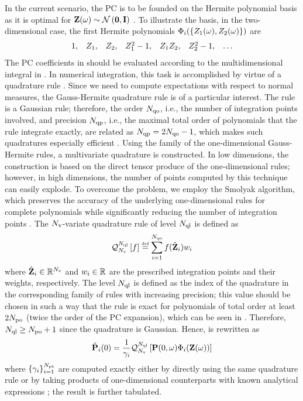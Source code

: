 In the current scenario, the PC is to be founded on the Hermite polynomial basis as it is optimal for $\vZ(\o) \sim \normal{\vZero}{\mI}$ \cite{xiu2002}. To illustrate the basis, in the two-dimensional case, the first Hermite polynomials $\Phi_i(\{ Z_1(\omega), Z_2(\omega) \})$ are
\[
  \begin{array}{lllllll}
  1, & Z_1, & Z_2, & Z_1^2 - 1, & Z_1 Z_2, & Z_2^2 - 1, & \dotsc
  \end{array}
\]
The PC coefficients in  should be evaluated according to the multidimensional integral in . In numerical integration, this task is accomplished by virtue of a quadrature rule \cite{press2007}. Since we need to compute expectations with respect to normal measures, the Gauss-Hermite quadrature rule is of a particular interest. The rule is a Gaussian rule; therefore, the order $N_\text{qo}$, i.e., the number of integration points involved, and precision $N_\text{qp}$, i.e., the maximal total order of polynomials that the rule integrate exactly, are related as $N_\text{qp} = 2 N_\text{qo} - 1$, which makes such quadratures especially efficient \cite{heiss2008}. Using the family of the one-dimensional Gauss-Hermite rules, a multivariate quadrature is constructed. In low dimensions, the construction is based on the direct tensor produce of the one-dimensional rules; however, in high dimensions, the number of points computed by this technique can easily explode. To overcome the problem, we employ the Smolyak algorithm, which preserves the accuracy of the underlying one-dimensional rules for complete polynomials while significantly reducing the number of integration points \cite{eldred2009, maitre2010, heiss2008}. The ${N_\text{v}}$-variate quadrature rule of level $N_\text{ql}$ is defined as
\[
  \mathcal{Q}_{{N_\text{v}}}^{N_\text{ql}}\left[f\right] \stackrel{\text{\tiny def}}{=} \sum_{i = 1}^{N_\text{qo}} f(\hat{\mathbf{Z}}_i) w_i
\]
where $\hat{\mathbf{Z}}_i \in \mathbb{R}^{N_\text{v}}$ and $w_i \in \mathbb{R}$ are the prescribed integration points and their weights, respectively. The level $N_\text{ql}$ is defined as the index of the quadrature in the corresponding family of rules with increasing precision; this value should be chosen in such a way that the rule is exact for polynomials of total order at least $2 {N_\text{po}}$ (twice the order of the PC expansion), which can be seen in  \cite{eldred2009}. Therefore, $N_\text{ql} \geq {N_\text{po}} + 1$ since the quadrature is Gaussian. Hence,  is rewritten as
\[
  \hat{\mathbf{P}}_i(0) = \frac{1}{\gamma_i} \mathcal{Q}_{{N_\text{v}}}^{N_\text{ql}}\left[\mathbf{P}(0, \omega) \Phi_i(\mathbf{Z}(\omega))\right]
\]
where $\{ \gamma_i \}_{i = 1}^{{N_\text{pt}}}$ are computed exactly either by directly using the same quadrature rule or by taking products of one-dimensional counterparts with known analytical expressions \cite{xiu2010}; the result is further tabulated.
